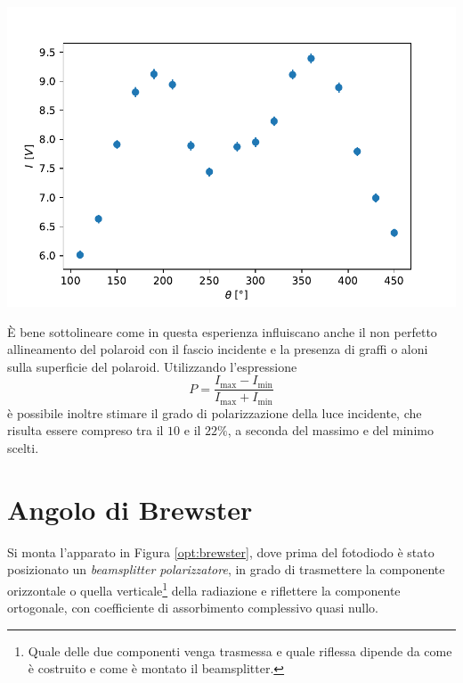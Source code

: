 \documentclass[10pt,oneside,a4paper]{article}
\newenvironment{Figure}
  {\par\medskip\noindent\minipage{\linewidth}}
  {\endminipage\par\medskip}
\begin{document}
\begin{multicols}{2}
\begin{Figure}
	\begin{center}
	\includegraphics[width=\linewidth]{single.pdf}
	\label{fig:single}
	\end{center}
\end{Figure}

È bene sottolineare come in questa esperienza influiscano anche il non perfetto allineamento del polaroid con il fascio incidente e la presenza di graffi o aloni sulla superficie del polaroid. Utilizzando l'espressione
\[
P = \frac{I_\text{max} - I_\text{min}}{I_\text{max} + I_\text{min}}
\]
è possibile inoltre stimare il grado di polarizzazione della luce incidente, che risulta essere compreso tra il $10$ e il $22 \%$, a seconda del massimo e del minimo scelti.







\section{Angolo di Brewster}
Si monta l'apparato in Figura \ref{opt:brewster}, dove prima del fotodiodo è stato posizionato un \emph{beamsplitter polarizzatore}, in grado di trasmettere la componente orizzontale o quella verticale\footnote{Quale delle due componenti venga trasmessa e quale riflessa dipende da come è costruito e come è montato il beamsplitter.} della radiazione e riflettere la componente ortogonale, con coefficiente di assorbimento complessivo quasi nullo. 


\end{multicols}
\end{document}
